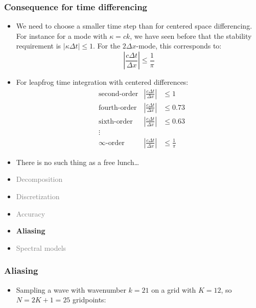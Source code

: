 \documentclass[aspectratio=43,9pt]{beamer}
\begin{document}
\begin{frame}
	\frametitle{Consequence for time differencing}
	\vfill\begin{itemize}
		\item We need to choose a smaller time step than for centered space differencing. For instance for a mode with $\kappa = c k$, we have seen before that the stability requirement is $| \kappa \Delta t | \le 1$. For the $2\Delta x$-mode, this corresponds to:
			\begin{equation*}
				\left| \frac{c \Delta t}{\Delta x} \right| \le \frac{1}{\pi}
			\end{equation*}\vfill
		\item For leapfrog time integration with centered differences:
			{\small
			\begin{align*}
				& \text{second-order} & \left|\frac{c\Delta t}{\Delta x}\right| & \le 1 \\
				& \text{fourth-order} & \left|\frac{c\Delta t}{\Delta x}\right| & \le 0.73 \\
				& \text{sixth-order} & \left|\frac{c\Delta t}{\Delta x}\right| & \le 0.63 \\
				&\vdots	\\
				& \infty\text{-order} & \left|\frac{c\Delta t}{\Delta x}\right| & \le \frac{1}{\pi}
			\end{align*}}\vfill
		\item There is no such thing as a free lunch\ldots
	\end{itemize}\vfill
\end{frame}
%
%
\begin{frame}
	\begin{itemize}
		\item \textcolor{gray}{Decomposition}
		\item \textcolor{gray}{Discretization}
		\item \textcolor{gray}{Accuracy}
		\item {\bfseries Aliasing}
		\item \textcolor{gray}{Spectral models}
	\end{itemize}
\end{frame}
%
%
\begin{frame}
	\frametitle{Aliasing}
	\vfill\begin{itemize}
		\item Sampling a wave with wavenumber $k=21$ on a grid with $K=12$, so $N=2K+1=25$ gridpoints:
			\begin{center}
				\only<2->{\scalebox{.7}{\small}}
			\end{center}\vfill
	\end{itemize}\vfill
\end{frame}
\end{document}
